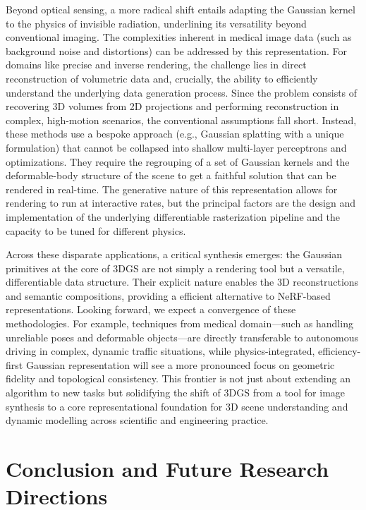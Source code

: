 \documentclass[11pt,a4paper]{article}
\begin{document}
Beyond optical sensing, a more radical shift entails adapting the Gaussian kernel to the physics of invisible radiation, underlining its versatility beyond conventional imaging. The complexities inherent in medical image data (such as background noise and distortions) can be addressed by this representation. For domains like precise and inverse rendering, the challenge lies in direct reconstruction of volumetric data and, crucially, the ability to efficiently understand the underlying data generation process. Since the problem consists of recovering 3D volumes from 2D projections and performing reconstruction in complex, high-motion scenarios, the conventional assumptions fall short. Instead, these methods use a bespoke approach (e.g., Gaussian splatting with a unique formulation) that cannot be collapsed into shallow multi-layer perceptrons and optimizations. They require the regrouping of a set of Gaussian kernels and the deformable-body structure of the scene to get a faithful solution that can be rendered in real-time. The generative nature of this representation allows for rendering to run at interactive
rates, but the principal factors are the design and implementation of the underlying differentiable rasterization pipeline and the capacity to be tuned for different physics.

Across these disparate applications, a critical synthesis emerges: the Gaussian primitives at the core of 3DGS are not simply a rendering tool but a versatile, differentiable data structure. Their explicit nature enables the 3D reconstructions and semantic compositions, providing a efficient alternative to NeRF-based representations. Looking forward, we expect a convergence of these methodologies. For example, techniques from medical domain---such as handling unreliable poses and deformable objects---are directly transferable to autonomous driving in complex, dynamic traffic situations, while physics-integrated, efficiency-first Gaussian representation will see a more pronounced focus on geometric fidelity and topological consistency. This frontier is not just about extending an	algorithm to new tasks but solidifying the shift of 3DGS from a tool for image synthesis to a core representational foundation for 3D scene understanding and dynamic modelling across scientific and engineering practice.


\section{Conclusion and Future Research Directions}
\end{document}

